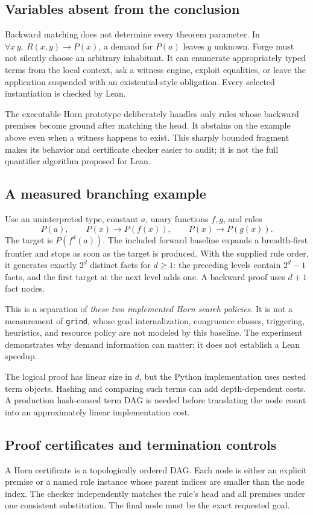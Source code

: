 \documentclass[11pt,a4paper]{article}
\newcommand{\code}[1]{\texttt{#1}}
\begin{document}
\subsection{Variables absent from the conclusion}
Backward matching does not determine every theorem parameter. In
$\forall x\,y,\ R(x,y)\to P(x)$, a demand for $P(a)$ leaves $y$ unknown. Forge
must not silently choose an arbitrary inhabitant. It can enumerate appropriately
typed terms from the local context, ask a witness engine, exploit equalities,
or leave the application suspended with an existential-style obligation.
Every selected instantiation is checked by Lean.

The executable Horn prototype deliberately handles only rules whose backward
premises become ground after matching the head. It abstains on the example
above even when a witness happens to exist. This sharply bounded fragment makes
its behavior and certificate checker easier to audit; it is not the full
quantifier algorithm proposed for Lean.

\subsection{A measured branching example}
Use an uninterpreted type, constant $a$, unary functions $f,g$, and rules
\[
 P(a),\qquad P(x)\to P(f(x)),\qquad P(x)\to P(g(x)).
\]
The target is $P(f^d(a))$. The included forward baseline expands a breadth-first
frontier and stops as soon as the target is produced. With the supplied rule
order, it generates exactly $2^d$ distinct facts for $d\ge1$: the preceding
levels contain $2^d-1$ facts, and the first target at the next level adds one.
A backward proof uses $d+1$ fact nodes.

This is a separation of \emph{these two implemented Horn search policies}.
It is not a measurement of \code{grind}, whose goal internalization, congruence
classes, triggering, heuristics, and resource policy are not modeled by this
baseline. The experiment demonstrates why demand information can matter; it
does not establish a Lean speedup.

The logical proof has linear size in $d$, but the Python implementation uses
nested term objects. Hashing and comparing such terms can add depth-dependent
costs. A production hash-consed term DAG is needed before translating the node
count into an approximately linear implementation cost.

\subsection{Proof certificates and termination controls}
A Horn certificate is a topologically ordered DAG. Each node is either an
explicit premise or a named rule instance whose parent indices are smaller
than the node index. The checker independently matches the rule's head and all
premises under one consistent substitution. The final node must be the exact
requested goal.
\end{document}
